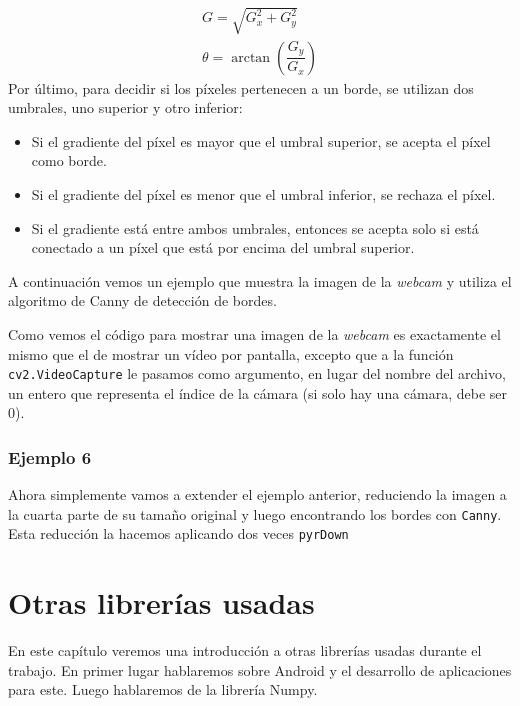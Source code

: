 \documentclass[a4paper,openright, 12pt]{book}
\begin{document}
\begin{equation*}
\begin{array}{l} G = \sqrt{ G_{x}^{2} + G_{y}^{2} } \\ \theta = \arctan(\dfrac{ G_{y} }{ G_{x} }) \end{array}
\end{equation*}
Por último, para decidir si los píxeles pertenecen a un borde, se utilizan dos umbrales, uno superior y otro inferior:
\begin{itemize}
\item Si el gradiente del píxel es mayor que el umbral superior, se acepta el píxel como borde.
\item Si el gradiente del píxel es menor que el umbral inferior, se rechaza el píxel.
\item Si el gradiente está entre ambos umbrales, entonces se acepta solo si está conectado a un píxel que está por encima del umbral superior.
\end{itemize}

A continuación vemos un ejemplo que muestra la imagen de la \textit{webcam} y utiliza el algoritmo de Canny de detección de bordes.

\newpage

Como vemos el código para mostrar una imagen de la \textit{webcam} es exactamente el mismo que el de mostrar un vídeo por pantalla, excepto que a la función \lstinline|cv2.VideoCapture| le pasamos como argumento, en lugar del nombre del archivo, un entero que representa el índice de la cámara (si solo hay una cámara, debe ser 0).
\newpage

\newpage 
\subsection*{Ejemplo 6}
Ahora simplemente vamos a extender el ejemplo anterior, reduciendo la imagen a la cuarta parte de su tamaño original  y luego encontrando los bordes con \lstinline|Canny|. Esta reducción la hacemos aplicando dos veces \lstinline|pyrDown|

\newpage

\chapter{Otras librerías usadas} \label{cap.otras}
En este capítulo veremos una introducción a otras librerías usadas durante el trabajo. En primer lugar hablaremos sobre Android y el desarrollo de aplicaciones para este. Luego hablaremos de la librería Numpy.
\end{document}
